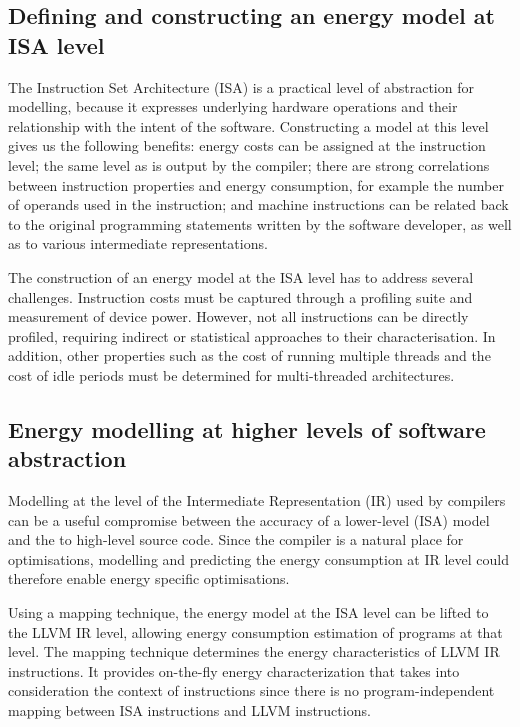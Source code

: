 \subsection{Defining and constructing an energy model at ISA level}

The Instruction Set Architecture (ISA) is a practical level of abstraction for modelling, because it expresses
underlying hardware operations and their relationship with the intent of the
software. Constructing a model at this level gives us the following benefits:
energy costs can be assigned at the instruction level; the same level
    as is output by the compiler;
 there are strong correlations between instruction properties and energy
    consumption, for example the number of operands used in the instruction;
and machine instructions can be related back to the original programming
    statements written by the software developer, as well as to various
    intermediate representations.

The construction of an energy model at the ISA level has to address several challenges.
 Instruction costs must be captured through a profiling suite and
    measurement of device power. However, not all instructions can be directly profiled, requiring indirect or
    statistical approaches to their characterisation.
In addition, other properties such as the cost of running multiple threads and the cost of idle periods must be determined for multi-threaded architectures.

\subsection{Energy modelling at higher levels of software abstraction}
\label{subsec:mapping}

Modelling at the level of the Intermediate Representation (IR) 
used by compilers can be a useful compromise between the accuracy of a lower-level (ISA) 
model and the to high-level source code. Since the compiler is a natural
place for optimisations, modelling and predicting the energy consumption at
IR level could therefore enable energy specific optimisations.

Using a mapping technique, 
the energy model at the ISA level can be lifted to the LLVM IR level, allowing energy
consumption estimation of programs at that level. 
The mapping technique determines the energy characteristics of LLVM IR
instructions. It provides on-the-fly energy characterization that takes into
consideration the context of instructions since there is no program-independent mapping between
ISA instructions and LLVM instructions.

